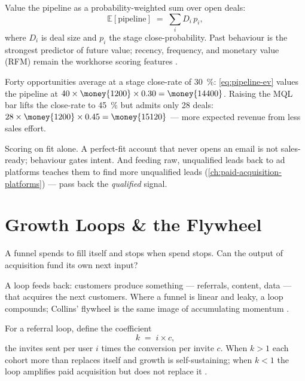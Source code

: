 \begin{derivation}
Value the pipeline as a probability-weighted sum over open deals:
\begin{equation}\label{eq:pipeline-ev}
  \mathbb{E}[\text{pipeline}] \;=\; \sum_{i} D_i\,p_i,
\end{equation}
where $D_i$ is deal size and $p_i$ the stage close-probability. Past behaviour is the strongest predictor of future value; recency, frequency, and monetary value (RFM) remain the workhorse scoring features \parencite{fader2005rfm,bult1995optimal}.
\end{derivation}

\begin{worked}
Forty opportunities average  at a stage close-rate of \qty{30}{\percent}: \cref{eq:pipeline-ev} values the pipeline at $40\times\money{1200}\times0.30=\money{14400}$. Raising the MQL bar lifts the close-rate to \qty{45}{\percent} but admits only \num{28} deals: $28\times\money{1200}\times0.45=\money{15120}$ --- more expected revenue from less sales effort.
\end{worked}

\begin{trap}
Scoring on fit alone. A perfect-fit account that never opens an email is not sales-ready; behaviour gates intent. And feeding raw, unqualified leads back to ad platforms teaches them to find more unqualified leads (\cref{ch:paid-acquisition-platforms}) --- pass back the \emph{qualified} signal.
\end{trap}

\section{Growth Loops \& the Flywheel}\label{sec:growth-loops}

\begin{decision}
A funnel spends to fill itself and stops when spend stops. Can the output of acquisition fund its own next input?
\end{decision}

\begin{intuition}
A loop feeds back: customers produce something --- referrals, content, data --- that acquires the next customers. Where a funnel is linear and leaky, a loop compounds; Collins' flywheel is the same image of accumulating momentum \parencite{collins2001good,ellis2017hacking}.
\end{intuition}

\begin{derivation}
For a referral loop, define the coefficient
\begin{equation}\label{eq:viral-k}
  k \;=\; i \times c,
\end{equation}
the invites sent per user $i$ times the conversion per invite $c$. When $k>1$ each cohort more than replaces itself and growth is self-sustaining; when $k<1$ the loop amplifies paid acquisition but does not replace it \parencite{leskovec2007dynamics}.
\end{derivation}

